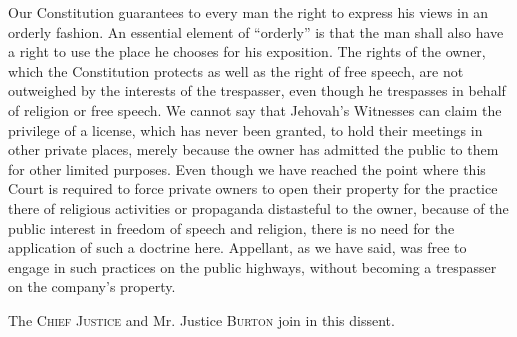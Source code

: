 Our Constitution guarantees to every man the right to express his views in an
orderly fashion. An essential element of ``orderly'' is that the man shall also
have a right to use the place he chooses for his exposition. The rights of the
owner, which the Constitution protects as well as the right of free speech, are
not outweighed by the interests of the trespasser, even though he trespasses in
behalf of religion or free speech. We cannot say that Jehovah's Witnesses can
claim the privilege of a license, which has never been granted, to hold their
meetings in other private places, merely because the owner has admitted the
public to them for other limited purposes. Even though we have reached the
point where this Court is required to force private owners to open their
property for the practice there of religious activities or propaganda
distasteful to the owner, because of the public interest in freedom of
speech and religion, there is no need for the application of such a doctrine
here. Appellant, as we have said, was free to engage in such practices on the
public highways, without becoming a trespasser on the company's property.

The \textsc{Chief Justice} and Mr. Justice \textsc{Burton} join in this dissent.


